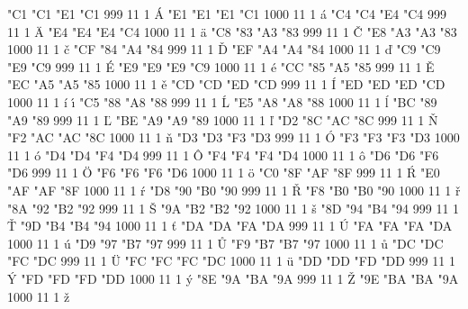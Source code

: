 
  

\setcharcode  "C1  "C1  "E1  "C1   999  11  1  \texaccent \'A
\setcharcode  "E1  "E1  "E1  "C1  1000  11  1  \texaccent \'a
\setcharcode  "C4  "C4  "E4  "C4   999  11  1  \texaccent \"A
\setcharcode  "E4  "E4  "E4  "C4  1000  11  1  \texaccent \"a
\setcharcode  "C8  "83  "A3  "83   999  11  1  \texaccent \v C
\setcharcode  "E8  "A3  "A3  "83  1000  11  1  \texaccent \v c
\setcharcode  "CF  "84  "A4  "84   999  11  1  \texaccent \v D
\setcharcode  "EF  "A4  "A4  "84  1000  11  1  \texaccent \v d
\setcharcode  "C9  "C9  "E9  "C9   999  11  1  \texaccent \'E
\setcharcode  "E9  "E9  "E9  "C9  1000  11  1  \texaccent \'e
\setcharcode  "CC  "85  "A5  "85   999  11  1  \texaccent \v E
\setcharcode  "EC  "A5  "A5  "85  1000  11  1  \texaccent \v e
\setcharcode  "CD  "CD  "ED  "CD   999  11  1  \texaccent \'I
\setcharcode  "ED  "ED  "ED  "CD  1000  11  1  \texaccent \'i  \texaccent \'\i
\setcharcode  "C5  "88  "A8  "88   999  11  1  \texaccent \'L
\setcharcode  "E5  "A8  "A8  "88  1000  11  1  \texaccent \'l
\setcharcode  "BC  "89  "A9  "89   999  11  1  \texaccent \v L
\setcharcode  "BE  "A9  "A9  "89  1000  11  1  \texaccent \v l
\setcharcode  "D2  "8C  "AC  "8C   999  11  1  \texaccent \v N
\setcharcode  "F2  "AC  "AC  "8C  1000  11  1  \texaccent \v n
\setcharcode  "D3  "D3  "F3  "D3   999  11  1  \texaccent \'O
\setcharcode  "F3  "F3  "F3  "D3  1000  11  1  \texaccent \'o
\setcharcode  "D4  "D4  "F4  "D4   999  11  1  \texaccent \^O
\setcharcode  "F4  "F4  "F4  "D4  1000  11  1  \texaccent \^o
\setcharcode  "D6  "D6  "F6  "D6   999  11  1  \texaccent \"O
\setcharcode  "F6  "F6  "F6  "D6  1000  11  1  \texaccent \"o
\setcharcode  "C0  "8F  "AF  "8F   999  11  1  \texaccent \'R
\setcharcode  "E0  "AF  "AF  "8F  1000  11  1  \texaccent \'r
\setcharcode  "D8  "90  "B0  "90   999  11  1  \texaccent \v R
\setcharcode  "F8  "B0  "B0  "90  1000  11  1  \texaccent \v r
\setcharcode  "8A  "92  "B2  "92   999  11  1  \texaccent \v S
\setcharcode  "9A  "B2  "B2  "92  1000  11  1  \texaccent \v s
\setcharcode  "8D  "94  "B4  "94   999  11  1  \texaccent \v T
\setcharcode  "9D  "B4  "B4  "94  1000  11  1  \texaccent \v t
\setcharcode  "DA  "DA  "FA  "DA   999  11  1  \texaccent \'U
\setcharcode  "FA  "FA  "FA  "DA  1000  11  1  \texaccent \'u
\setcharcode  "D9  "97  "B7  "97   999  11  1  \texaccent \r U
\setcharcode  "F9  "B7  "B7  "97  1000  11  1  \texaccent \r u
\setcharcode  "DC  "DC  "FC  "DC   999  11  1  \texaccent \"U
\setcharcode  "FC  "FC  "FC  "DC  1000  11  1  \texaccent \"u
\setcharcode  "DD  "DD  "FD  "DD   999  11  1  \texaccent \'Y
\setcharcode  "FD  "FD  "FD  "DD  1000  11  1  \texaccent \'y
\setcharcode  "8E  "9A  "BA  "9A   999  11  1  \texaccent \v Z
\setcharcode  "9E  "BA  "BA  "9A  1000  11  1  \texaccent \v z

